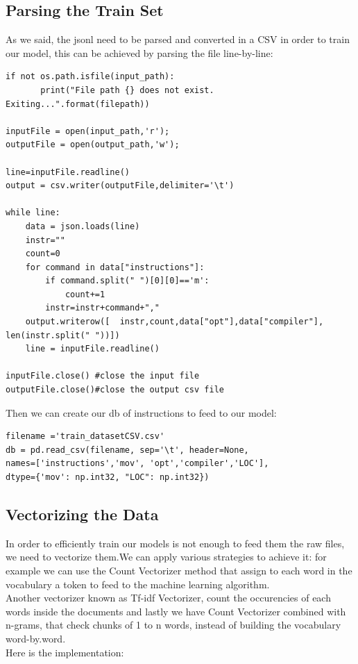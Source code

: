 \documentclass{article}
\begin{document}
\subsection{Parsing the Train Set}
As we said, the jsonl need to be parsed and converted in a CSV in order to train our model, this can be achieved by parsing the file line-by-line:\\

\begin{verbatim}
if not os.path.isfile(input_path):
       print("File path {} does not exist. Exiting...".format(filepath))
        
inputFile = open(input_path,'r');
outputFile = open(output_path,'w');

line=inputFile.readline()
output = csv.writer(outputFile,delimiter='\t')

while line:
    data = json.loads(line)
    instr=""
    count=0
    for command in data["instructions"]:
        if command.split(" ")[0][0]=='m':
            count+=1
        instr=instr+command+","
    output.writerow([  instr,count,data["opt"],data["compiler"], len(instr.split(" "))])
    line = inputFile.readline()

inputFile.close() #close the input file
outputFile.close()#close the output csv file
\end{verbatim}
Then we can create our db of instructions to feed to our model:
\begin{verbatim}
filename ='train_datasetCSV.csv'
db = pd.read_csv(filename, sep='\t', header=None, 
names=['instructions','mov', 'opt','compiler','LOC'], 
dtype={'mov': np.int32, "LOC": np.int32})
\end{verbatim}

\subsection{Vectorizing the Data}
In order to efficiently train our models is not enough to feed them the raw files, we need to vectorize them.We can apply various strategies to achieve it: for example we can use the Count Vectorizer method that assign to each word in the vocabulary a token to feed to the machine learning algorithm.\\
Another vectorizer known as Tf-idf Vectorizer, count the occurencies of each words inside the documents and lastly we have Count Vectorizer combined with n-grams, that check chunks of 1 to n words, instead of building the vocabulary word-by.word.\\Here is the implementation:\\
\end{document}
